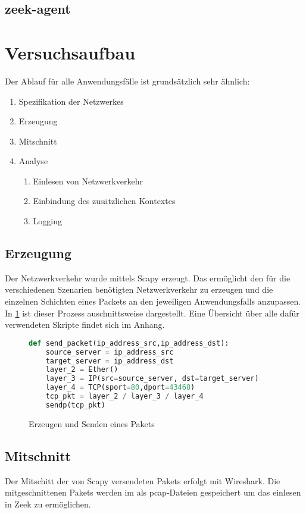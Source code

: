 \subsection{zeek-agent}
\cite{zeek_agent}

\section{Versuchsaufbau}
Der Ablauf für alle Anwendungsfälle ist grundsätzlich sehr ähnlich:
\begin{enumerate}
\item{Spezifikation der Netzwerkes}
\item{Erzeugung}
\item{Mitschnitt}
\item{Analyse}
\begin{enumerate}
\item{Einlesen von Netzwerkverkehr}
\item{Einbindung des zusätzlichen Kontextes}
\item{Logging}
\end{enumerate}
\end{enumerate}
\subsection{Erzeugung}
Der Netzwerkverkehr wurde mittels Scapy erzeugt. Das ermöglicht den für die verschiedenen Szenarien benötigten Netzwerkverkehr zu erzeugen und die einzelnen Schichten eines Packets an den jeweiligen Anwendungsfalls anzupassen. In \ref{Code_1} ist dieser Prozess auschnittsweise dargestellt. Eine Übersicht über alle dafür verwendeten Skripte findet sich im Anhang.
\begin{figure}[h!]
\label{Code_1}
\centering
\begin{lstlisting}[language=python]
def send_packet(ip_address_src,ip_address_dst):
    source_server = ip_address_src
    target_server = ip_address_dst
    layer_2 = Ether()
    layer_3 = IP(src=source_server, dst=target_server)
    layer_4 = TCP(sport=80,dport=43468)
    tcp_pkt = layer_2 / layer_3 / layer_4
    sendp(tcp_pkt)
\end{lstlisting}
\caption{Erzeugen und Senden eines Pakets}
\end{figure}
\subsection{Mitschnitt}
Der Mitschitt der von Scapy versendeten Pakets erfolgt mit Wireshark. Die mitgeschnittenen Pakets werden im als pcap-Dateien gespeichert um das einlesen in Zeek zu ermöglichen.


